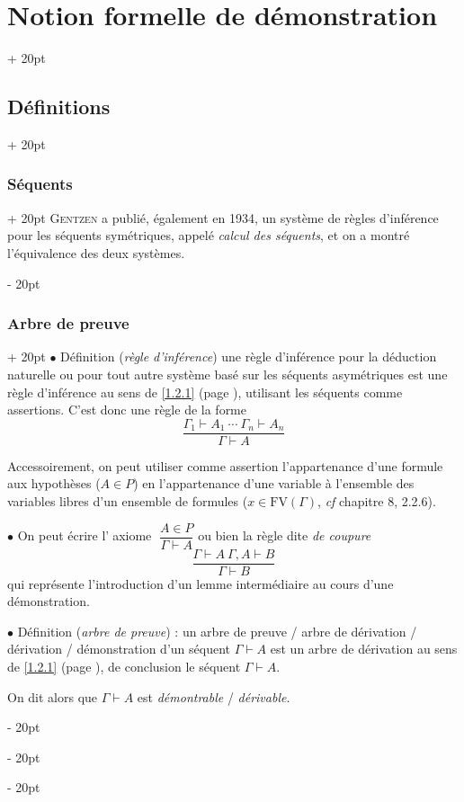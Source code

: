 \documentclass[a4paper, 12pt, twoside]{article}
\newcommand{\simplecit}[1]{\guillemotleft$\;$#1$\;$\guillemotright}
\newcommand{\ind}[1][20pt]{\advance\leftskip + #1}
\newcommand{\deind}[1][20pt]{\advance\leftskip - #1}
\newenvironment{indt}[2][20pt]{#2 \par \ind[#1]}{\par \deind} %
\begin{document}
\begin{indt}{\section{Notion formelle de démonstration}}
\begin{indt}{\subsection{Définitions}}
\begin{indt}{\subsubsection{Séquents}}
                \textsc{Gentzen} a publié, également en 1934, un système de règles d'inférence pour les séquents symétriques, appelé \emph{calcul des séquents}, et on a montré l'équivalence des deux systèmes.
            \end{indt}

            \vspace{12pt}
            
            \begin{indt}{\subsubsection{Arbre de preuve}}
                $\bullet$ Définition (\emph{règle d'inférence}) une règle d'inférence pour la déduction naturelle ou pour tout autre système basé sur les séquents asymétriques est une règle d'inférence au sens de \ref{1.2.1} (page \pageref{1.2.1}), utilisant les séquents comme assertions.
                C'est donc une règle de la forme
                \[
                    \dfrac{\Gamma_1 \vdash A_1 \ \cdots \ \Gamma_n \vdash A_n}{\Gamma \vdash A}
                \]

                Accessoirement, on peut utiliser comme assertion l'appartenance d'une formule aux hypothèses ($A \in P$) en l'appartenance d'une variable à l'ensemble des variables libres d'un ensemble de formules ($x \in \mathrm{FV}(\Gamma)$, \textit{cf} chapitre 8, 2.2.6).

                \vspace{12pt}
                
                $\bullet$ On peut écrire l'\simplecit{axiome} $\dfrac{A \in P}{\Gamma \vdash A}$ ou bien la règle dite \emph{de coupure}
                \[
                    \dfrac{\Gamma \vdash A\ \Gamma, A \vdash B}{\Gamma \vdash B}
                \]
                qui représente l'introduction d'un lemme intermédiaire au cours d'une démonstration.

                \vspace{12pt}
                
                $\bullet$ Définition (\emph{arbre de preuve}) : un arbre de preuve / arbre de dérivation / dérivation / démonstration d'un séquent $\Gamma \vdash A$ est un arbre de dérivation au sens de \ref{1.2.1} (page \pageref{1.2.1}), de conclusion le séquent $\Gamma \vdash A$.

                On dit alors que $\Gamma \vdash A$ est \emph{démontrable} / \emph{dérivable}.


\end{indt}
\end{indt}
\end{indt}
\end{document}
